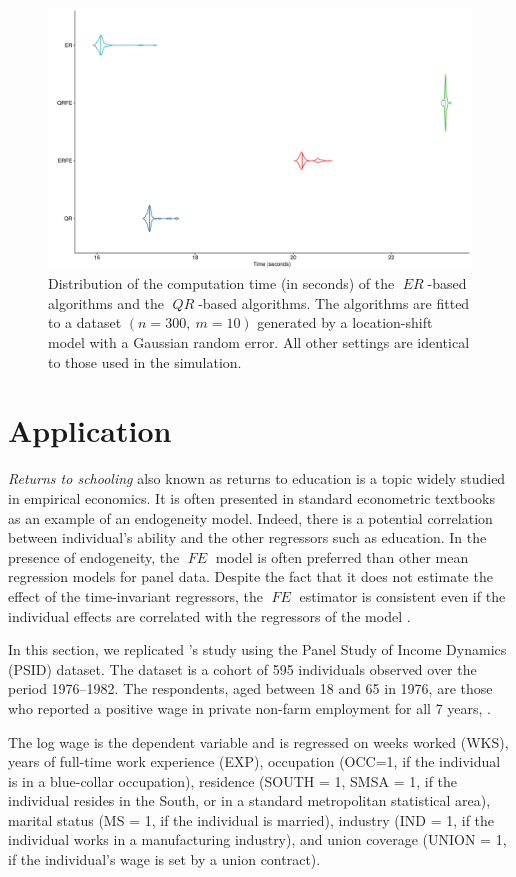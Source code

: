 \documentclass[15pt,a4paper]{article}
\DeclareMathOperator{\ER}{\textit{ER}}
\DeclareMathOperator{\QR}{\textit{QR}}
\DeclareMathOperator{\FE}{\textit{FE}}
\begin{document}
\begin{figure}[hbt!]
\centering
\includegraphics[width=0.5\linewidth]{Graph_main/bench}
    \caption{Distribution of the computation time (in seconds) of the $\ER$-based algorithms and the $\QR$-based algorithms. The algorithms are fitted to a dataset $(n=300, \ m=10)$ generated by a location-shift model with a Gaussian random error. All other settings are identical to those used in the simulation. } \label{fig:bench}
\end{figure}

\section{Application}\label{Application_erfe}

\textit{Returns to schooling} also known as returns to education is a topic widely studied in empirical economics. It is often presented in standard econometric textbooks \citep{baltagi2008, Greene2011, CameronTrivedi2005} as an example of an endogeneity model. Indeed, there is a potential correlation between individual's ability and the other regressors such as education. In the presence of endogeneity, the $\FE$ model is often preferred than other mean regression models for panel data. Despite the fact that it does not estimate the effect of the time-invariant regressors, the $\FE$ estimator is consistent even if the individual effects are correlated with the regressors of the model \citep{baltagi2008}. 

In this section, we replicated \citet{BaltagiKhantiAkom1990}'s study using the Panel Study of Income Dynamics (PSID) dataset. The dataset is a cohort of 595 individuals observed over the period 1976--1982. The respondents, aged between 18 and 65 in 1976, are those who reported a positive wage in private non-farm employment for all 7 years, \citep{CornwellRupert1988}.

The log wage is the dependent variable and is regressed on weeks worked (WKS), years of full-time work experience (EXP), occupation (OCC=1, if the individual is in a blue-collar occupation), residence (SOUTH = 1, SMSA = 1, if the individual resides in the South, or in a standard metropolitan statistical area), marital status (MS = 1, if the individual is married), industry (IND = 1, if the individual works in a manufacturing industry), and union coverage (UNION = 1, if the individual's wage is set by a union contract). 
\end{document}
